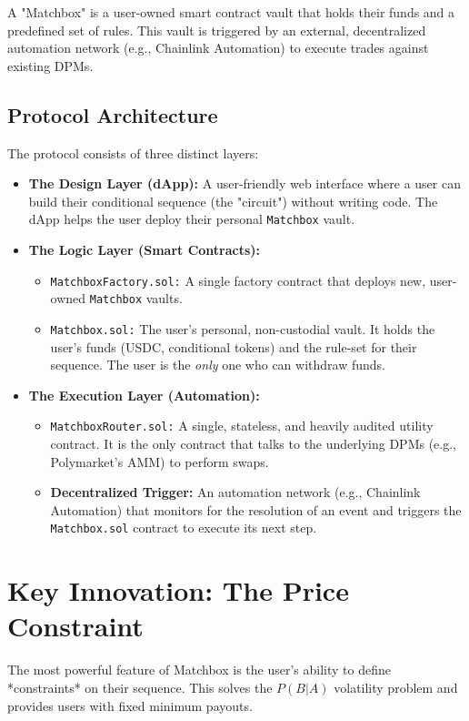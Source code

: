 \documentclass[11pt, a4paper]{article}
\begin{document}
A "Matchbox" is a user-owned smart contract vault that holds their funds and a predefined set of rules. This vault is triggered by an external, decentralized automation network (e.g., Chainlink Automation) to execute trades against existing DPMs.

\subsection{Protocol Architecture}
The protocol consists of three distinct layers:

\begin{itemize}
    \item \textbf{The Design Layer (dApp):} A user-friendly web interface where a user can build their conditional sequence (the "circuit") without writing code. The dApp helps the user deploy their personal \texttt{Matchbox} vault.

    \item \textbf{The Logic Layer (Smart Contracts):}
    \begin{itemize}
        \item \texttt{MatchboxFactory.sol:} A single factory contract that deploys new, user-owned \texttt{Matchbox} vaults.
        \item \texttt{Matchbox.sol:} The user's personal, non-custodial vault. It holds the user's funds (USDC, conditional tokens) and the rule-set for their sequence. The user is the \textit{only} one who can withdraw funds.
    \end{itemize}

    \item \textbf{The Execution Layer (Automation):}
    \begin{itemize}
        \item \texttt{MatchboxRouter.sol:} A single, stateless, and heavily audited utility contract. It is the only contract that talks to the underlying DPMs (e.g., Polymarket's AMM) to perform swaps.
        \item \textbf{Decentralized Trigger:} An automation network (e.g., Chainlink Automation) that monitors for the resolution of an event and triggers the \texttt{Matchbox.sol} contract to execute its next step.
    \end{itemize}
\end{itemize}

\section{Key Innovation: The Price Constraint}
The most powerful feature of Matchbox is the user's ability to define *constraints* on their sequence. This solves the $P(B|A)$ volatility problem and provides users with fixed minimum payouts.
\end{document}
